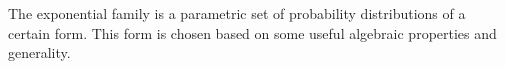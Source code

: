 
The exponential family is a parametric set of probability distributions of a certain form. This form is chosen based on some useful algebraic properties and generality.
